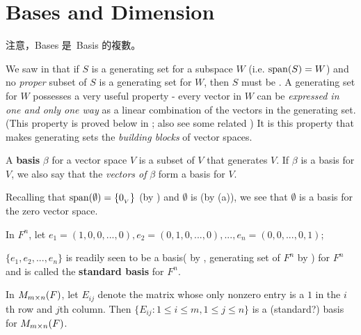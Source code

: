 \section{Bases and Dimension} \label{sec 1.6}

\begin{note}
注意，Bases 是\ Basis 的複數。
\end{note}

We saw in  that if \(S\) is a generating set for a subspace \(W\) (i.e. \(\operatorname{span}(S) = W\)) and no \emph{proper} subset of \(S\) is a generating set for \(W\), then \(S\) must be \LID{}.
A \LID{} generating set for \(W\) possesses a very useful property - every vector in \(W\) can be \emph{expressed in one and only one way} as a linear combination of the vectors in the generating set.
(This property is proved below in ; also see some related )
It is this property that makes \LID{}
generating sets the \emph{building blocks} of vector spaces.

\begin{definition} \label{def 1.8}
A \textbf{basis} \(\beta\) for a vector space \(V\) is a  \LID{} subset of \(V\)  that generates \(V\).
If \(\beta\) is a basis for \(V\), we also say that the
\emph{vectors of} \(\beta\) form a basis for \(V\).
\end{definition}

\begin{example} \label{example 1.6.1}
Recalling that \(\operatorname{span}(\emptyset) = \{ 0_{_V} \}\) (by ) and \(\emptyset\) is \LID{} (by (a)), we see that \(\emptyset\) is a basis for the zero vector space.
\end{example}

\begin{example} \label{example 1.6.2}
In \(F^n\), let \(e_1 = (1, 0, 0, ..., 0), e_2 = (0, 1, 0, ..., 0), ..., e_n = (0, 0, ..., 0, 1)\);

\(\{ e_1, e_2, ..., e_n \}\) is readily seen to be a basis(\LID{} by , generating set of \(F^n\) by ) for \(F^n\) and is called the \textbf{standard basis} for \(F^n\).
\end{example}

\begin{example} \label{example 1.6.3}
In \(M_{m \times n}(F)\), let \(E_{ij}\) denote the matrix whose only nonzero entry is a \(1\) in the \(i\)th row and \(j\)th column.
Then \(\{ E_{ij} : 1 \le i \le m, 1 \le j \le n \}\) is a (standard?) basis for \(M_{m \times n}(F)\).
\end{example}

